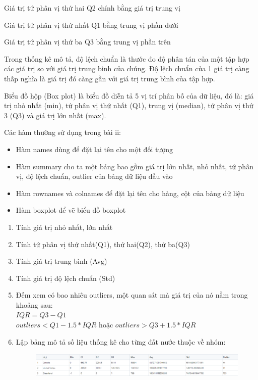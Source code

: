\documentclass[a4paper]{article}
\theoremstyle{definition}
\begin{document}
\begin{enumerate}[i)]
    Giá trị tứ phân vị thứ hai Q2 chính bằng giá trị trung vị
    
    Giá trị tứ phân vị thứ nhất Q1 bằng trung vị phần dưới
    
    Giá trị tứ phân vị thứ ba Q3 bằng trung vị phần trên
    
    Trong thống kê mô tả, độ lệch chuẩn là thước đo độ phân tán của một tập hợp các giá trị so với giá trị trung bình của chúng. Độ lệch chuẩn của 1 giá trị càng thấp nghĩa là giá trị đó càng gần với giá trị trung bình của tập hợp.
    
    Biểu đồ hộp (Box plot) là biểu đồ diễn tả 5 vị trí phân bố của dữ liệu, đó là: giá trị nhỏ nhất (min), tứ phân vị thứ nhất (Q1), trung vị (median), tứ phân vị thứ 3 (Q3) và giá trị lớn nhất (max).
    
    Các hàm thường sử dụng trong bài ii:
        \begin{itemize}
    \item Hàm names dùng để đặt lại tên cho một đối tượng
    \item Hàm summary cho ta một bảng bao gồm giá trị lớn nhất, nhỏ nhất, tứ phân vị, độ lệch chuẩn, outlier của bảng dữ liệu đầu vào
    \item Hàm rownames và colnames để đặt lại tên cho hàng, cột của bảng dữ liệu
    \item Hàm boxplot để vẽ biểu đồ boxplot
        \end{itemize}
			\begin{enumerate}[1)]
				\item Tính giá trị nhỏ nhất, lớn nhất
				\item Tính tứ phân vị thứ nhất(Q1), thứ hai(Q2), thứ ba(Q3) 
				\item Tính giá trị trung bình (Avg)
				\item Tính giá trị độ lệch chuẩn (Std)
				\item Đếm xem có bao nhiêu outliers, một quan sát mà giá trị của nó nằm trong khoảng sau:\\
				$IQR = Q3 - Q1$\\
				$outliers < Q1 - 1.5*IQR$ hoặc $outliers > Q3 + 1.5*IQR$
				\item Lập bảng mô tả số liệu thống kê cho từng đất nước thuộc về nhóm: \\
				\begin{figure}[H]
					\centering
					\includegraphics[scale=0.5]{images/2.1.png}

\end{figure}
\end{enumerate}
\end{enumerate}
\end{document}
